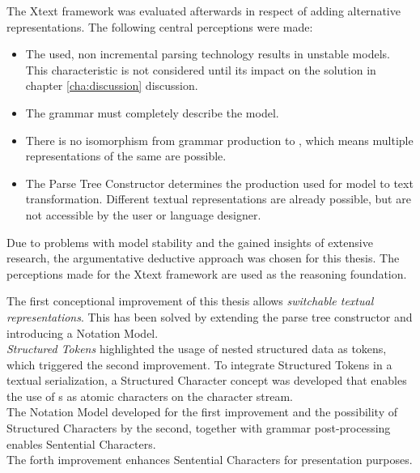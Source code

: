 The Xtext framework was evaluated afterwards in respect of adding alternative representations.
The following central perceptions were made:
\begin{itemize}
	\item The used, non incremental parsing technology results in unstable models. This characteristic is not considered until its impact on the solution in chapter \ref{cha:discussion} discussion.
	\item The grammar must completely describe the model. 
	\item There is no isomorphism from grammar production to , which means multiple representations of the same  are possible.
	\item The Parse Tree Constructor determines the production used for model to text transformation. Different textual representations are already possible, but are not accessible by the user or language designer. \\
\end{itemize}

Due to problems with model stability and the gained insights of extensive research, the argumentative deductive approach was chosen for this thesis. The perceptions made for the Xtext framework are used as the reasoning foundation. 

The first conceptional improvement of this thesis allows \emph{switchable textual representations}. This has been solved by extending the parse tree constructor and introducing a Notation Model.\\

\emph{Structured Tokens} highlighted the usage of nested structured data as tokens, which triggered the second improvement. To integrate Structured Tokens in a textual serialization, a Structured Character concept was developed that enables the use of s as atomic characters on the character stream. \\

The Notation Model developed for the first improvement and the possibility of Structured Characters by the second, together with grammar post-processing enables Sentential Characters. \\

The forth improvement enhances Sentential Characters for presentation purposes.
